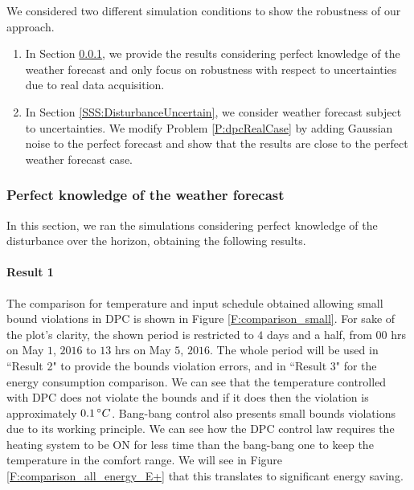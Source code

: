 \textcolor[rgb]{0,0,1}{We considered two different simulation conditions to show the robustness of our approach.
\begin{enumerate}
	\item In Section \ref{SSS:DisturbancePerfect}, we provide the results considering perfect knowledge of the weather forecast and only focus on robustness with respect to uncertainties due to real data acquisition.
	\item In Section \ref{SSS:DisturbanceUncertain}, we consider weather forecast subject to uncertainties. We modify Problem \ref{P:dpcRealCase} by adding Gaussian noise to the perfect forecast and show that the results are close to the perfect weather forecast case.
\end{enumerate}
\subsubsection{Perfect knowledge of the weather forecast}\label{SSS:DisturbancePerfect}
In this section, we ran the simulations considering perfect knowledge of the disturbance over the horizon, obtaining the following results.}
\paragraph{Result 1} The comparison for temperature and input schedule obtained allowing small bound violations in DPC is shown in Figure \ref{F:comparison_small}. For sake of the plot's clarity, the shown period is restricted to $4$ days and a half, from $00$ hrs on May $1$, $2016$ to  $13$ hrs on May $5$, $2016$. \textcolor[rgb]{0,0,1}{The whole period will be used in ``Result 2" to provide the bounds violation errors, and in ``Result 3" for the energy consumption comparison.}
We can see that the temperature controlled with DPC does not violate the bounds and if it does then the violation is approximately $0.1\,\degree C$. Bang-bang control also presents small bounds violations due to its working principle. We can see how the DPC control law requires the heating system to be ON for less time than the bang-bang one to keep the temperature in the comfort range. 
We will see in Figure \ref{F:comparison_all_energy_E+} that this translates to significant energy saving.


